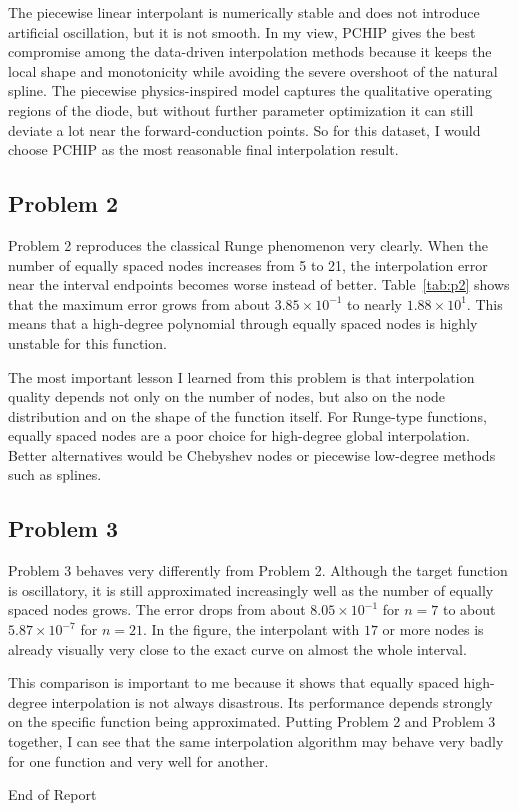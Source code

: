 \documentclass[12pt,a4paper]{article}
\begin{document}
The piecewise linear interpolant is numerically stable and does not introduce artificial oscillation, but it is not smooth. In my view, PCHIP gives the best compromise among the data-driven interpolation methods because it keeps the local shape and monotonicity while avoiding the severe overshoot of the natural spline. The piecewise physics-inspired model captures the qualitative operating regions of the diode, but without further parameter optimization it can still deviate a lot near the forward-conduction points. So for this dataset, I would choose PCHIP as the most reasonable final interpolation result.

\subsection{Problem 2}

Problem 2 reproduces the classical Runge phenomenon very clearly. When the number of equally spaced nodes increases from 5 to 21, the interpolation error near the interval endpoints becomes worse instead of better. Table~\ref{tab:p2} shows that the maximum error grows from about $3.85\times 10^{-1}$ to nearly $1.88\times 10^{1}$. This means that a high-degree polynomial through equally spaced nodes is highly unstable for this function.

The most important lesson I learned from this problem is that interpolation quality depends not only on the number of nodes, but also on the node distribution and on the shape of the function itself. For Runge-type functions, equally spaced nodes are a poor choice for high-degree global interpolation. Better alternatives would be Chebyshev nodes or piecewise low-degree methods such as splines.

\subsection{Problem 3}

Problem 3 behaves very differently from Problem 2. Although the target function is oscillatory, it is still approximated increasingly well as the number of equally spaced nodes grows. The error drops from about $8.05\times 10^{-1}$ for $n=7$ to about $5.87\times 10^{-7}$ for $n=21$. In the figure, the interpolant with $17$ or more nodes is already visually very close to the exact curve on almost the whole interval.

This comparison is important to me because it shows that equally spaced high-degree interpolation is not always disastrous. Its performance depends strongly on the specific function being approximated. Putting Problem 2 and Problem 3 together, I can see that the same interpolation algorithm may behave very badly for one function and very well for another.

\vfill
\begin{center}
{\fontsize{28}{32}\selectfont\calligra End of Report}
\end{center}
\vspace*{2em}
\end{document}
